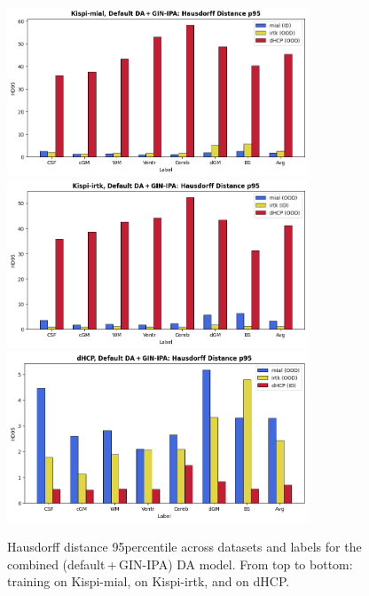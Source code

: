 \begin{figure}[htbp]
    \centering
    \includegraphics[width=0.8\textwidth]{figures/mial_both_HD.png}\\
    \vspace{2pt}
    \includegraphics[width=0.8\textwidth]{figures/irtk_both_HD.png}\\
    \vspace{2pt}
    \includegraphics[width=0.8\textwidth]{figures/dHCP_both_HD.png}
    \caption{Hausdorff distance 95\th percentile across datasets and labels for the combined (default\,+\,GIN-IPA) DA model. From top to bottom: training on Kispi-mial, on Kispi-irtk, and on dHCP.}
    \label{fig:both_HD}
\end{figure}
